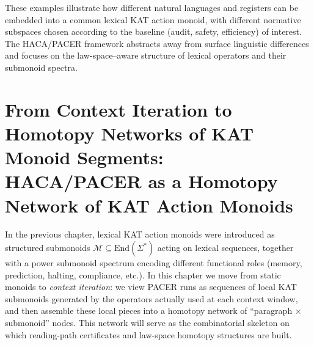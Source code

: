 \documentclass[11pt]{book}
\theoremstyle{plain}
\theoremstyle{definition}
\theoremstyle{remark}
\begin{document}
These examples illustrate how different natural languages and registers
can be embedded into a common lexical KAT action monoid, with different
normative subspaces chosen according to the baseline (audit, safety,
efficiency) of interest. The HACA/PACER framework abstracts away from
surface linguistic differences and focuses on the law-space–aware
structure of lexical operators and their submonoid spectra.

\chapter[From Context Iteration to Homotopy Networks of KAT Monoid Segments]{From Context Iteration to Homotopy Networks of KAT Monoid Segments:\\
         HACA/PACER as a Homotopy Network of KAT Action Monoids}


In the previous chapter, lexical KAT action monoids were introduced as
structured submonoids $\mathcal{M}\subseteq\mathrm{End}(\Sigma^*)$
acting on lexical sequences, together with a power submonoid spectrum
 encoding different functional roles (memory, prediction, halting,
 compliance, etc.). In this chapter we move from static monoids to
 \emph{context iteration}: we view PACER runs as sequences of local
 KAT submonoids generated by the operators actually used at each
context window, and then assemble these local pieces into a homotopy
 network of ``paragraph $\times$ submonoid'' nodes. This network will
 serve as the combinatorial skeleton on which reading-path certificates
 and law-space homotopy structures are built.
\end{document}
